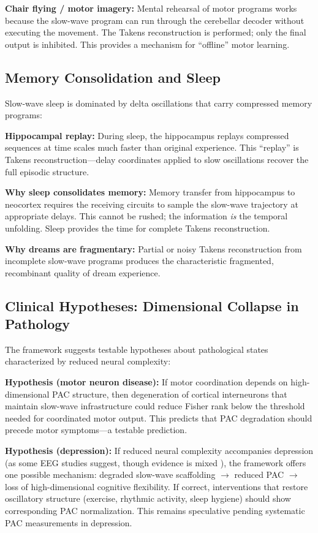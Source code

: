 \documentclass[12pt]{article}
\begin{document}
\textbf{Chair flying / motor imagery:} Mental rehearsal of motor programs works because the slow-wave program can run through the cerebellar decoder without executing the movement. The Takens reconstruction is performed; only the final output is inhibited. This provides a mechanism for ``offline'' motor learning.

\subsection{Memory Consolidation and Sleep}

Slow-wave sleep is dominated by delta oscillations that carry compressed memory programs:

\textbf{Hippocampal replay:} During sleep, the hippocampus replays compressed sequences at time scales much faster than original experience. This ``replay'' is Takens reconstruction---delay coordinates applied to slow oscillations recover the full episodic structure.

\textbf{Why sleep consolidates memory:} Memory transfer from hippocampus to neocortex requires the receiving circuits to sample the slow-wave trajectory at appropriate delays. This cannot be rushed; the information \emph{is} the temporal unfolding. Sleep provides the time for complete Takens reconstruction.

\textbf{Why dreams are fragmentary:} Partial or noisy Takens reconstruction from incomplete slow-wave programs produces the characteristic fragmented, recombinant quality of dream experience.

\subsection{Clinical Hypotheses: Dimensional Collapse in Pathology}

The framework suggests testable hypotheses about pathological states characterized by reduced neural complexity:

\textbf{Hypothesis (motor neuron disease):} If motor coordination depends on high-dimensional PAC structure, then degeneration of cortical interneurons that maintain slow-wave infrastructure could reduce Fisher rank below the threshold needed for coordinated motor output. This predicts that PAC degradation should precede motor symptoms---a testable prediction.

\textbf{Hypothesis (depression):} If reduced neural complexity accompanies depression (as some EEG studies suggest, though evidence is mixed \citep{goldberger2002complexity}), the framework offers one possible mechanism: degraded slow-wave scaffolding $\to$ reduced PAC $\to$ loss of high-dimensional cognitive flexibility. If correct, interventions that restore oscillatory structure (exercise, rhythmic activity, sleep hygiene) should show corresponding PAC normalization. This remains speculative pending systematic PAC measurements in depression.
\end{document}
